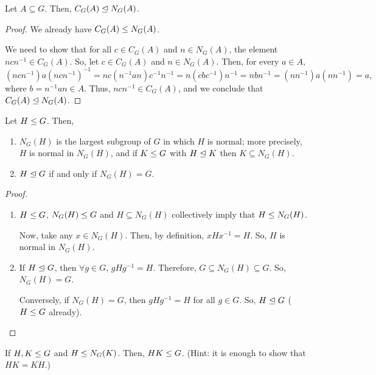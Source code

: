 \documentclass[11pt]{penrose}
\begin{document}
\begin{nprop}
    Let $A \subseteq G$. Then, $C_{G}(A) \mathrel{\trianglelefteq} N_{G}(A)$.
\end{nprop}
\begin{proof}
    We already have $C_{G}(A) \mathrel{\leq} N_{G}(A)$.

    We need to show that for all $c \in C_{G}(A)$ and $n \in N_{G}(A)$, the element $n c n^{-1} \in C_{G}(A)$. So, let $c \in C_{G}(A)$ and $n \in N_{G}(A)$. Then, for every $a \in A$,
    \begin{equation*}
        (ncn^{-1}) a (ncn^{-1})^{-1}
        = nc(n^{-1} a n)c^{-1}n^{-1}
        = n(cbc^{-1})n^{-1}
        = nbn^{-1}
        = (nn^{-1}) a (nn^{-1})
        = a,
    \end{equation*}
    where $b = n^{-1} a n \in A$. Thus, $n c n^{-1} \in C_{G}(A)$, and we conclude that $C_{G}(A) \mathrel{\trianglelefteq} N_{G}(A)$.
\end{proof}

\begin{nprop}
    Let $H \mathrel{\leq} G$. Then,
    \begin{enumerate}
        \item $N_{G}(H)$ is the largest subgroup of $G$ in which $H$ is normal; more precisely, $H$ is normal in $N_{G}(H)$, and if $K \mathrel{\leq} G$ with $H \mathrel{\trianglelefteq} K$ then $K \subseteq N_{G}(H)$.
        \item $H \mathrel{\trianglelefteq} G$ if and only if $N_{G}(H) = G$.
    \end{enumerate}
\end{nprop}
\begin{proof}\phantom{}
    \begin{enumerate}
        \item $H \mathrel{\leq} G$, $N_{G}(H) \mathrel{\leq} G$ and $H \subseteq N_{G}(H)$ collectively imply that $H \mathrel{\leq} N_{G}(H)$.

        Now, take any $x \in N_{G}(H)$. Then, by definition, $xHx^{-1} = H$. So, $H$ is normal in $N_{G}(H)$.

        \item If $H \mathrel{\trianglelefteq} G$, then $\forall g \in G$, $gHg^{-1} = H$. Therefore, $G \subseteq N_{G}(H) \subseteq G$. So, $N_{G}(H) = G$.

        Conversely, if $N_{G}(H) = G$, then $gHg^{-1} = H$ for all $g \in G$. So, $H \mathrel{\trianglelefteq} G$ ($H \mathrel{\leq} G$ already).
    \end{enumerate}
\end{proof}

\begin{nex}
    If $H, K \mathrel{\leq} G$ and $H \mathrel{\leq} N_{G}(K)$. Then, $HK \mathrel{\leq} G$. (Hint: it is enough to show that $HK = KH$.)
\end{nex}
\end{document}
